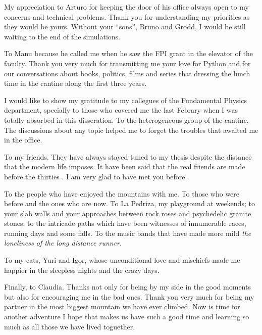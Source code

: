 \documentclass[b5paper,openright,10pt]{book}
\begin{document}
My appreciation to Arturo for keeping the door of his office always open to my concerns and technical problems. Thank you for understanding my priorities as they would be yours. Without your ``sons'', Bruno and Grodd, I would be still waiting to the end of the simulations. 

To Manu because he called me when he saw the FPI grant in the elevator of the faculty. Thank you very much for transmitting me your love for Python and for our conversations about books, politics, films and series that dressing the lunch time in the cantine along the first three years. 

I would like to show my gratitude to my collegues of the Fundamental Physics department, specially to those who covered me the last Febrary when I was totally absorbed in this disseration. To the heterogeneous group of the cantine. The discussions about any topic helped me to forget the troubles that awaited me in the office. 

To my friends. They have always stayed tuned to my thesis despite the distance that the modern life imposes. It have been said that the real friends are made before the thirties \cite{Llaneras2018}. I am very glad to have met you before. 

To the people who have enjoyed the mountains with me. To those who were before and the ones who are now. To La Pedriza, my playground at weekends; to your slab walls and your approaches between rock roses and psychedelic granite stones; to the intricade paths which have been witnesses of innumerable races, running days and some falls. To the music bands that have made more mild {\it the loneliness of the long distance runner}.  

To my cats, Yuri and Igor, whose unconditional love and mischiefs made me happier in the sleepless nights and the crazy days.  

Finally, to Claudia. Thanks not only for being by my side in the good moments but also for encouraging me in the bad ones. Thank you very much for being my partner in the most biggest mountain we have ever climbed. Now is time for another adventure I hope that makes us have such a good time and learning so much as all those we have lived toguether.  

\pagestyle{Contents}  %
\tableofcontents %
\end{document}
